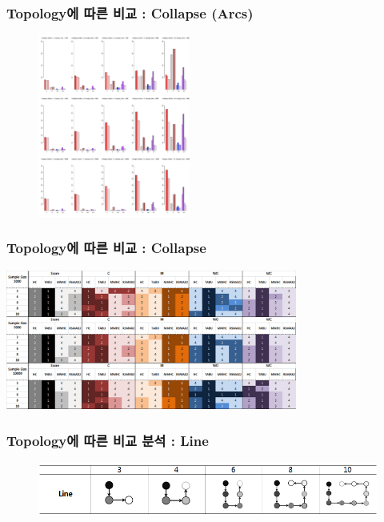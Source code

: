 \documentclass{beamer}
\begin{document}
\begin{frame}
\frametitle{Topology에 따른 비교 : Collapse (Arcs)}
{\scriptsize{}
	\begin{figure}
		\includegraphics[height=170pt]{images/01_Collapse_Arcs}
	\end{figure}	
}
\end{frame}



\begin{frame}
\frametitle{Topology에 따른 비교 : Collapse}
{\scriptsize{}
	\begin{center}
		\includegraphics[height=130pt]{images/Result_Collapse}
	\end{center}
}
\end{frame}



\begin{frame}
\frametitle{Topology에 따른 비교 분석 : Line}
{\scriptsize{}
	\begin{figure}
		\includegraphics[height=50pt]{images/Topologies_Line}
	\end{figure}	
}
\end{frame}
\end{document}
